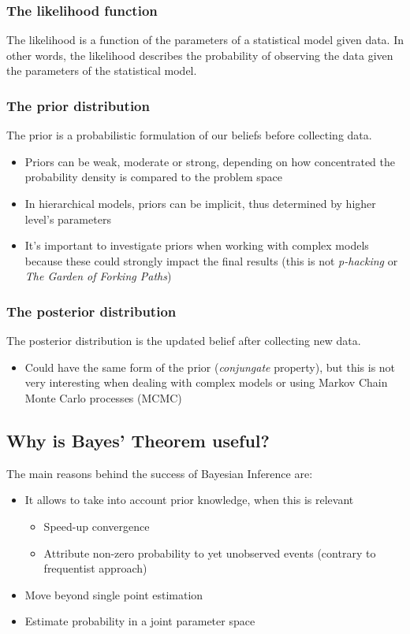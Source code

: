 \documentclass[11pt]{beamer}
\begin{document}
\begin{frame}
	\frametitle{The likelihood function}
	The likelihood is a function of the parameters of a statistical model given data. In other words, the likelihood describes the probability of observing the data given the parameters of the statistical model.
\end{frame}

\begin{frame}
	\frametitle{The prior distribution}
	The prior is a probabilistic formulation of our beliefs before collecting data.
	\begin{itemize}
		\item Priors can be weak, moderate or strong, depending on how concentrated the probability density is compared to the problem space
		\item In hierarchical models, priors can be implicit, thus determined by higher level's parameters
		\item It's important to investigate priors when working with complex models because these could strongly impact the final results (this is not \textit{p-hacking} or \textit{The Garden of Forking Paths})
	\end{itemize}

\end{frame}

\begin{frame}
	\frametitle{The posterior distribution}
	The posterior distribution is the updated belief after collecting new data.
	\begin{itemize}
		\item Could have the same form of the prior (\textit{conjungate} property), but this is not very interesting when dealing with complex models or using Markov Chain Monte Carlo processes (MCMC)
	\end{itemize}
\end{frame}

\subsection{Why is Bayes' Theorem useful?}
\begin{frame}
	The main reasons behind the success of Bayesian Inference are:
	\begin{itemize}
		\item It allows to take into account prior knowledge, when this is relevant
		\begin{itemize}
			\item Speed-up convergence
			\item Attribute non-zero probability to yet unobserved events (contrary to frequentist approach)
		\end{itemize}
		\item Move beyond single point estimation
		\item Estimate probability in a joint parameter space
	\end{itemize}		
\end{frame}
\end{document}

